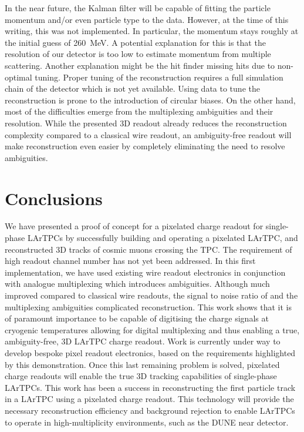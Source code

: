 \documentclass[instruments,article,submit,moreauthors,pdftex]{Definitions/mdpi}
\begin{document}
\afterpage{\clearpage}

In the near future, the Kalman filter will be capable of fitting the particle momentum and/or even particle type to the data.
However, at the time of this writing, this was not implemented.
In particular, the momentum stays roughly at the initial guess of \SI{260}{\mega\electronvolt}.
A potential explanation for this is that the resolution of our detector is too low to estimate momentum from multiple scattering.
Another explanation might be the hit finder missing hits due to non-optimal tuning.
Proper tuning of the reconstruction requires a full simulation chain of the detector which is not yet available.
Using data to tune the reconstruction is prone to the introduction of circular biases.
On the other hand, most of the difficulties emerge from the multiplexing ambiguities and their resolution.
While the presented 3D readout already reduces the reconstruction complexity compared to a classical wire readout, an ambiguity-free readout will make reconstruction even easier by completely eliminating the need to resolve ambiguities.

\clearpage


\section{Conclusions} \label{sec:Summary}

We have presented a proof of concept for a pixelated charge readout for single-phase LArTPCs by successfully building and operating a pixelated LArTPC, and reconstructed 3D tracks of cosmic muons crossing the TPC.
The requirement of high readout channel number has not yet been addressed.
In this first implementation, we have used existing wire readout electronics in conjunction with analogue multiplexing which introduces ambiguities.
Although much improved compared to classical wire readouts, the signal to noise ratio of and the multiplexing ambiguities complicated reconstruction.
This work shows that it is of paramount importance to be capable of digitising the charge signals at cryogenic temperatures allowing for digital multiplexing and thus enabling a true, ambiguity-free, 3D LArTPC charge readout.
Work is currently under way to develop bespoke pixel readout electronics, based on the requirements highlighted by this demonstration. 
Once this last remaining problem is solved, pixelated charge readouts will enable the true 3D tracking capabilities of single-phase LArTPCs.
This work has been a success in reconstructing the first particle track in a LArTPC using a pixelated charge readout.   
This technology will provide the necessary reconstruction efficiency and background rejection to enable LArTPCs to operate in high-multiplicity environments, such as the DUNE near detector.
\end{document}
